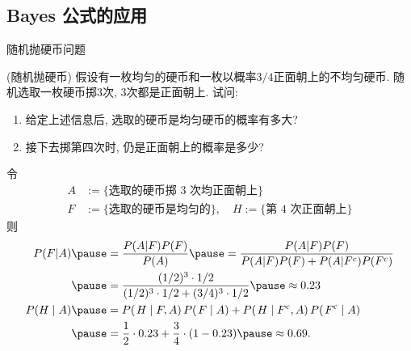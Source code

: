 \subsection{Bayes 公式的应用}
\begin{frame}{随机抛硬币问题}
	\begin{exam}({\tc 随机抛硬币}) 假设有一枚均匀的硬币和一枚以概率$3/4$正面朝上的不均匀硬币. 随机选取一枚硬币掷$3$次, $3$次都是正面朝上. 试问: %
		\vspace{-0.4cm}
	\begin{enumerate}[<+-|alert@+>]
		\item 给定上述信息后, 选取的硬币是均匀硬币的概率有多大?
		\item 接下去掷第四次时, 仍是正面朝上的概率是多少?
		\end{enumerate}
	\end{exam}
	\pause
\begin{jieda}
  令 \begin{align*}
	A &:=\{\mbox{选取的硬币掷 3 次均正面朝上}\}\\
	F & :=\{\mbox{选取的硬币是均匀的}\},\quad
	H :=\{\mbox{第 4 次正面朝上} \}
  \end{align*}
  则\pause
  {\small \begin{align*}
	P(F|A) \pause &=\frac{P(A|F)P(F)}{P(A)}\pause =\frac{P(A|F)P(F)}{P(A|F)P(F)+P(A|F^c)P(F^c)} \\
	\pause &=\frac{(1/2)^3 \cdot 1/2}{(1/2)^3 \cdot 1/2 +(3/4)^3 \cdot  1/2}\pause \approx 0.23\\
    P(H\mid A)\pause & =P(\left.H\mid F,A\right)P(\left.F\mid A\right)+P(\left.H\mid F^{\mathrm{c}},A\right)P(\left.F^{\mathrm{c}}\mid A\right)  \\
	\pause &=\frac{1}{2}\cdot0.23+\frac{3}{4}\cdot(1-0.23) \pause \approx 0.69.
  \end{align*}}
\end{jieda}



\end{frame}




